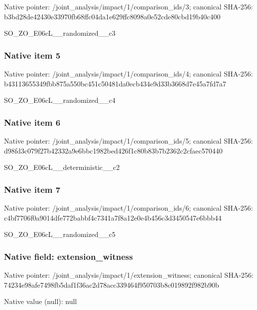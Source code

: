 \documentclass[10pt,a4paper]{article}
\begin{document}
Native pointer: /joint\_analysis/impact/1\allowbreak{}/comparison\_ids/3; canonical SHA-256: b3bd28de42430e33970fb68f\allowbreak{}fc04da1e629ffc8098a0e52c\allowbreak{}de80cbd19b40c400


SO\_ZO\_E06cL\_\_randomized\_\_c3


\subsubsection{Native item 5}


Native pointer: /joint\_analysis/impact/1\allowbreak{}/comparison\_ids/4; canonical SHA-256: b43113655349fbb875a550bc\allowbreak{}451c50481da0ecb434e9d33b\allowbreak{}3668d7e45a7fd7a7


SO\_ZO\_E06cL\_\_randomized\_\_c4


\subsubsection{Native item 6}


Native pointer: /joint\_analysis/impact/1\allowbreak{}/comparison\_ids/5; canonical SHA-256: d98fd3c079f27b42332a9e6b\allowbreak{}bc1982bed426f1c80b83b7b2\allowbreak{}362c2cfaec570440


SO\_ZO\_E06cL\_\_deterministic\_\_c2


\subsubsection{Native item 7}


Native pointer: /joint\_analysis/impact/1\allowbreak{}/comparison\_ids/6; canonical SHA-256: c4bf7706f0a9014dfe772bab\allowbreak{}bf4c7341a7f8a12e0e4b456c\allowbreak{}3d3450547e6bbb44


SO\_ZO\_E06cL\_\_randomized\_\_c5


\subsubsection{Native field: extension\_witness}


Native pointer: /joint\_analysis/impact/1\allowbreak{}/extension\_witness; canonical SHA-256: 74234e98afe7498fb5daf1f3\allowbreak{}6ac2d78acc339464f950703b\allowbreak{}8c019892f982b90b



Native value (null): null
\end{document}
